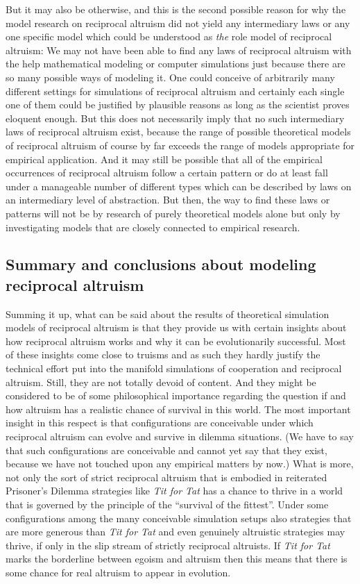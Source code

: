 But it may also be otherwise, and this is the second possible reason for why
the model research on reciprocal altruism did not yield any intermediary laws
or any one specific model which could be understood as {\em the} role model of
reciprocal altruism: We may not have been able to find any laws of reciprocal
altruism with the help mathematical modeling or computer simulations just
because there are so many possible ways of modeling it. One could conceive of
arbitrarily many different settings for simulations of reciprocal altruism and
certainly each single one of them could be justified by plausible reasons as
long as the scientist proves eloquent enough. But this does not necessarily
imply that no such intermediary laws of reciprocal altruism exist, because the
range of possible theoretical models of reciprocal altruism of course by
far exceeds the range of models appropriate for empirical application. And it
may still be possible that all of the empirical occurrences of reciprocal
altruism follow a certain pattern or do at least fall under a manageable number
of different types which can be described by laws on an intermediary level of
abstraction. But then, the way to find these laws or patterns will not be by
research of purely theoretical models alone but only by investigating models
that are closely connected to empirical research.

\subsection{Summary and conclusions about modeling reciprocal altruism}

\label{summaryReciprocalAltruism}

Summing it up, what can be said about the results of theoretical simulation
models of reciprocal altruism is that they provide us with certain insights
about how reciprocal altruism works and why it can be evolutionarily
successful. Most of these insights come close to truisms and as such they
hardly justify the technical effort put into the manifold simulations of
cooperation and reciprocal altruism. Still, they are not totally devoid of
content. And they might be considered to be of some philosophical importance
regarding the question if and how altruism has a realistic chance of survival
in this world.  The most important insight in this respect is that
configurations are conceivable under which reciprocal altruism can evolve and
survive in dilemma situations. (We have to say that such configurations are
conceivable and cannot yet say that they exist, because we have not touched
upon any empirical matters by now.) What is more, not only the sort of strict
reciprocal altruism that is embodied in reiterated Prisoner's Dilemma
strategies like {\em Tit for Tat} has a chance to thrive in a world that is 
governed by the principle of the ``survival of the fittest''.
Under some configurations among the many
conceivable simulation setups also strategies that are more generous than {\em
  Tit for Tat} and even genuinely altruistic strategies may thrive, if only in
the slip stream of strictly reciprocal altruists. If {\em Tit for Tat} marks
the borderline between egoism and altruism then this means that there is some
chance for real altruism to appear in evolution.

